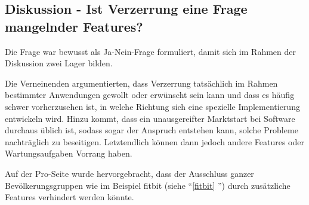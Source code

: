 \subsection{Diskussion - Ist Verzerrung eine Frage mangelnder Features?}
Die Frage war bewusst als Ja-Nein-Frage formuliert, damit sich im Rahmen der Diskussion zwei Lager bilden.

Die Verneinenden argumentierten, dass Verzerrung tatsächlich im Rahmen bestimmter Anwendungen gewollt oder erwünscht sein kann und dass es häufig schwer vorherzusehen ist, in welche Richtung sich eine spezielle Implementierung entwickeln wird. Hinzu kommt, dass ein unausgereifter Marktstart bei Software durchaus üblich ist, sodass sogar der Anspruch entstehen kann, solche Probleme nachträglich zu beseitigen. Letztendlich können dann jedoch andere Features oder Wartungsaufgaben Vorrang haben.

Auf der Pro-Seite wurde hervorgebracht, dass der Ausschluss ganzer Bevölkerungsgruppen wie im Beispiel fitbit (siehe \enquote{\ref{fitbit} }) durch zusätzliche Features verhindert werden könnte.
